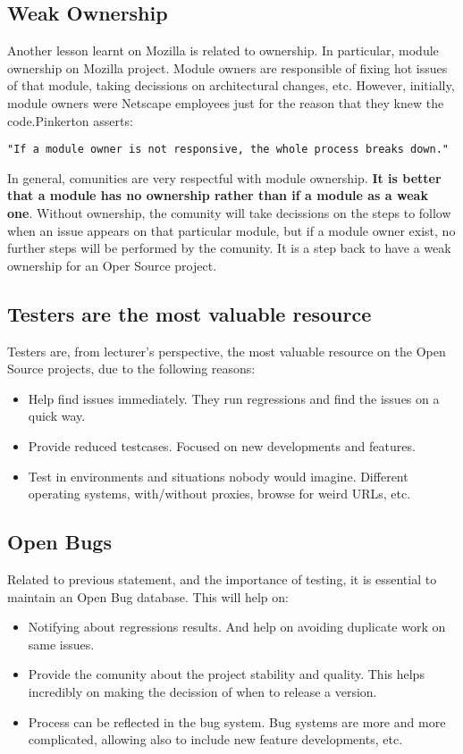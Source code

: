 \documentclass[11pt]{article}
\begin{document}
\subsection{Weak Ownership}
Another lesson learnt on Mozilla is related to ownership. In particular, module ownership on Mozilla project. Module owners are responsible of fixing hot issues of that module, taking decissions on architectural changes, etc. However, initially, module owners were Netscape employees just for the reason that they knew the code.Pinkerton asserts:
\begin{verbatim}
"If a module owner is not responsive, the whole process breaks down."
\end{verbatim}
In general, comunities are very respectful with module ownership. \textbf{It is better that a module has no ownership rather than if a module as a weak one}. Without ownership, the comunity will take decissions on the steps to follow when an issue appears on that particular module, but if a module owner exist, no further steps will be performed by the comunity. It is a step back to have a weak ownership for an Oper Source project.

\subsection{Testers are the most valuable resource}
Testers are, from lecturer's perspective, the most valuable resource on the Open Source projects, due to the following reasons:
\begin{itemize}\itemsep0pt
\item{Help find issues immediately}. They run regressions and find the issues on a quick way.
\item{Provide reduced testcases}. Focused on new developments and features.
\item{Test in environments and situations nobody would imagine}. Different operating systems, with/without proxies, browse for weird URLs, etc.
\end{itemize}

\subsection{Open Bugs}
Related to previous statement, and the importance of testing, it is essential to maintain an Open Bug database. This will help on:
\begin{itemize}\itemsep0pt
\item{Notifying about regressions results}. And help on avoiding duplicate work on same issues.
\item{Provide the comunity about the project stability and quality}. This helps incredibly on making the decission of when to release a version.
\item{Process can be reflected in the bug system}. Bug systems are more and more complicated, allowing also to include new feature developments, etc.
\end{itemize}
\end{document}

